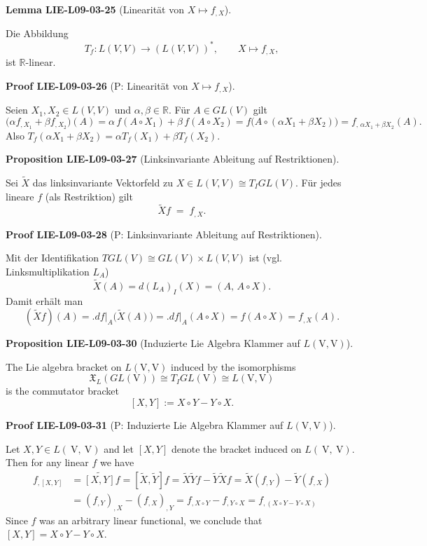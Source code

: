 \documentclass[10pt, letterpaper]{article}
\newcommand{\CustomHeading}[3]{%
  \par\medskip\noindent%
  \textbf{#1 #2} \textnormal{(#3)}.\enskip%
}
\newenvironment{PROP}[2]{\CustomHeading{Proposition}{#1}{#2}}{}
\newenvironment{LEM}[2]{\CustomHeading{Lemma}{#1}{#2}}{}
\newenvironment{PROOF}[2]{\CustomHeading{Proof}{#1}{#2}}{}
\begin{document}
\begin{LEM}{LIE-L09-03-25}{Linearität von $X\mapsto f_{,X}$}
Die Abbildung
\[
T_f:L(V,V)\longrightarrow (L(V,V))^*,\qquad X\longmapsto f_{,X},
\]
ist $\mathbb R$-linear.
\end{LEM}

\begin{PROOF}{LIE-L09-03-26}{P: Linearität von $X\mapsto f_{,X}$}
Seien $X_1,X_2\in L(V,V)$ und $\alpha,\beta\in\mathbb R$. Für $A\in GL(V)$ gilt
\[
\bigl(\alpha f_{,X_1}+\beta f_{,X_2}\bigr)(A)=\alpha\,f(A\circ X_1)+\beta\,f(A\circ X_2)
=f\bigl(A\circ(\alpha X_1+\beta X_2)\bigr)=f_{,\,\alpha X_1+\beta X_2}(A).
\]
Also $T_f(\alpha X_1+\beta X_2)=\alpha T_f(X_1)+\beta T_f(X_2)$.
\end{PROOF}

\begin{PROP}{LIE-L09-03-27}{Linksinvariante Ableitung auf Restriktionen}
Sei $\widetilde X$ das linksinvariante Vektorfeld zu $X\in L(V,V)\cong T_I GL(V)$.
Für jedes lineare $f$ (als Restriktion) gilt
\[
\widetilde X f \;=\; f_{,X}.
\]
\end{PROP}

\begin{PROOF}{LIE-L09-03-28}{P: Linksinvariante Ableitung auf Restriktionen}
Mit der Identifikation $T GL(V)\cong GL(V)\times L(V,V)$ ist (vgl. Linksmultiplikation $L_A$)
\[
\widetilde X(A)=d(L_A)_I(X)=(A,\,A\circ X).
\]
Damit erhält man
\[
(\widetilde X f)(A)=\bigl.df\bigr|_A\bigl(\widetilde X(A)\bigr)=\bigl.df\bigr|_A(A\circ X)=f(A\circ X)=f_{,X}(A).
\]
\end{PROOF}

\begin{PROP}{LIE-L09-03-30}{Induzierte Lie Algebra Klammer auf $L(\mathrm{V},\mathrm{V})$}
The Lie algebra bracket on $L(\mathrm{V},\mathrm{V})$ induced by the isomorphisms 
$$\mathfrak{X}_{L}(G L(\mathrm{V})) \cong T_{I} G L(\mathrm{V}) \cong L(\mathrm{V}, \mathrm{V})$$ is the commutator bracket
$$
[X, Y]:=X \circ Y-Y \circ X .
$$
\end{PROP}

\begin{PROOF}{LIE-L09-03-31}{P: Induzierte Lie Algebra Klammer auf $L(\mathrm{V},\mathrm{V})$}
Let $X, Y \in L(\mathrm{~V}, \mathrm{~V})$ and let $[X, Y]$ denote the bracket induced on $L(\mathrm{~V}, \mathrm{~V})$. Then for any linear $f$ we have
$$
\begin{aligned}
f_{,[X, Y]} & =\widetilde{[X, Y]} f=[\widetilde{X}, \widetilde{Y}] f=\widetilde{X} \widetilde{Y} f-\widetilde{Y} \widetilde{X} f=\widetilde{X}\left(f_{, Y}\right)-\widetilde{Y}\left(f_{, X}\right) \\
& =\left(f_{, Y}\right)_{, X}-\left(f_{, X}\right)_{, Y}=f_{, X \circ Y}-f_{, Y \circ X}=f_{,(X \circ Y-Y \circ X)}
\end{aligned}
$$
Since $f$ was an arbitrary linear functional, we conclude that $[X, Y]= X \circ Y-Y \circ X$.
\end{PROOF}
\end{document}
